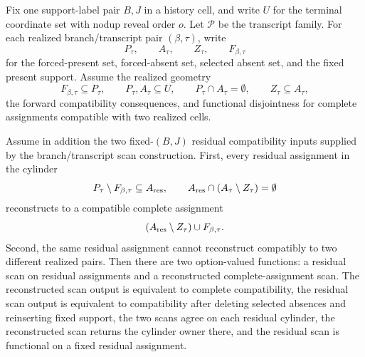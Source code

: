 \begin{helper}
Fix one support-label pair \(B,J\) in a history cell, and write \(U\) for
the terminal coordinate set with nodup reveal order \(o\).  Let
\(\mathcal P\) be the transcript family.  For each realized
branch/transcript pair \((\beta,\tau)\), write
\[
P_\tau,\qquad A_\tau,\qquad Z_\tau,\qquad F_{\beta,\tau}
\]
for the forced-present set, forced-absent set, selected absent set, and the
fixed present support.  Assume the realized geometry
\[
F_{\beta,\tau}\subseteq P_\tau,\qquad
P_\tau,A_\tau\subseteq U,\qquad
P_\tau\cap A_\tau=\emptyset,\qquad
Z_\tau\subseteq A_\tau ,
\]
the forward compatibility consequences, and functional disjointness for
complete assignments compatible with two realized cells.

Assume in addition the two fixed-\((B,J)\) residual compatibility inputs
supplied by the branch/transcript scan construction.  First, every residual
assignment in the cylinder
\[
P_\tau\setminus F_{\beta,\tau}\subseteq A_{\rm res},\qquad
A_{\rm res}\cap(A_\tau\setminus Z_\tau)=\emptyset
\]
reconstructs to a compatible complete assignment
\[
(A_{\rm res}\setminus Z_\tau)\cup F_{\beta,\tau}.
\]
Second, the same residual assignment cannot reconstruct compatibly to two
different realized pairs.  Then there are two option-valued functions: a
residual scan on residual assignments and a reconstructed complete-assignment
scan.  The reconstructed scan output is equivalent to complete compatibility,
the residual scan output is equivalent to compatibility after deleting
selected absences and reinserting fixed support, the two scans agree on each
residual cylinder, the reconstructed scan returns the cylinder owner there,
and the residual scan is functional on a fixed residual assignment.
\end{helper}
